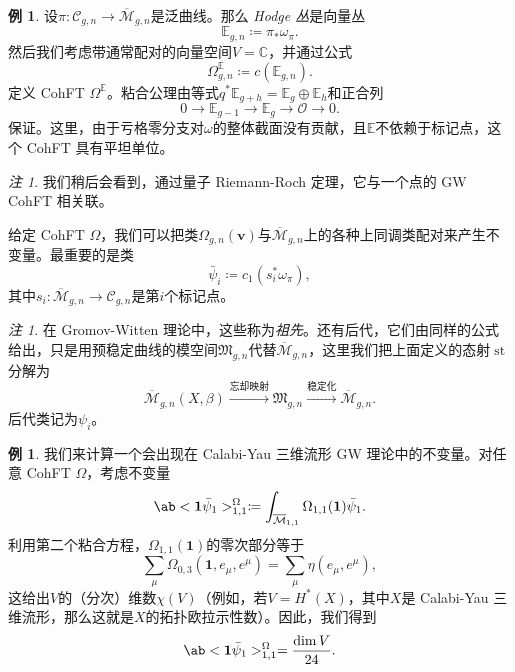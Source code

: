 \documentclass{amsart}
\theoremstyle{definition}
\newtheorem{exm}[thm]{例}
\theoremstyle{remark}
\newtheorem{rmk}[thm]{注}
\theoremstyle{plain}
\theoremstyle{definition}
\theoremstyle{remark}
\newcommand{\C}{\mathbb{C}}
\newcommand{\E}{\mathbb{E}}
\newcommand{\Mbar}{\overline{\mathcal{M}}}
\newcommand{\mc}[1]{\mathcal{#1}}
\newcommand{\mf}[1]{\mathfrak{#1}}
\newcommand{\mbf}[1]{\mathbf{#1}}
\newcommand{\bv}{\mbf{v}}
\newcommand{\1}{\mathbf{1}}
\newcommand{\2}{\mathbf{2}}
\newcommand{\3}{\mathbf{3}}
\DeclareMathOperator{\st}{st}
\begin{document}
\begin{exm}
    设$\pi \colon \mc{C}_{g,n} \to \Mbar_{g,n}$是泛曲线。那么 \textit{Hodge 丛}是向量丛
    \[ \E_{g,n} \coloneqq \pi_* \omega_{\pi}. \]
    然后我们考虑带通常配对的向量空间$V = \C$，并通过公式
    \[ \Omega^{\E}_{g,n} \coloneqq c(\E_{g,n}). \]
    定义 CohFT $\Omega^{\E}$。粘合公理由等式$q^* \E_{g+h} = \E_g \oplus \E_h$和正合列
    \[ 0 \to \E_{g-1} \to \E_g \to \mc{O} \to 0. \]
    保证。这里，由于亏格零分支对$\omega$的整体截面没有贡献，且$\E$不依赖于标记点，这个 CohFT 具有平坦单位。
\end{exm}

\begin{rmk}
    我们稍后会看到，通过量子 Riemann-Roch 定理，它与一个点的 GW CohFT 相关联。
\end{rmk}

给定 CohFT $\Omega$，我们可以把类$\Omega_{g,n}(\bv)$与$\Mbar_{g,n}$上的各种上同调类配对来产生不变量。最重要的是类
\[ \bar{\psi}_i \coloneqq c_1( s_i^* \omega_{\pi} ), \]
其中$s_i \colon \Mbar_{g,n} \to \mc{C}_{g,n}$是第$i$个标记点。

\begin{rmk}
    在 Gromov-Witten 理论中，这些称为\textit{祖先}。还有后代，它们由同样的公式给出，只是用预稳定曲线的模空间$\mf{M}_{g,n}$代替$\Mbar_{g,n}$，这里我们把上面定义的态射$\st$分解为
    \[ \Mbar_{g,n}(X,\beta) \xrightarrow{\text{忘却映射}} \mf{M}_{g,n} \xrightarrow{\text{稳定化}} \Mbar_{g,n}. \]
    后代类记为$\psi_i$。
\end{rmk}

\begin{exm}
    我们来计算一个会出现在 Calabi-Yau 三维流形 GW 理论中的不变量。对任意 CohFT $\Omega$，考虑不变量
    \[ \ab<\1\bar{\psi}_1>_{1,1}^{\Omega}\coloneqq \int_{\Mbar_{1,1}} \Omega_{1,1}(\1)\bar{\psi}_1. \]
    利用第二个粘合方程，$\Omega_{1,1}(\1)$的零次部分等于
    \[ \sum_{\mu} \Omega_{0,3}(\1, e_{\mu}, e^{\mu}) = \sum_{\mu} \eta(e_{\mu}, e^{\mu}), \]
    这给出$V$的（分次）维数$\chi(V)$（例如，若\(V = H^*(X)\)，其中\(X\)是 Calabi-Yau 三维流形，那么这就是\(X\)的拓扑欧拉示性数）。因此，我们得到
    \[ \ab<\1\bar{\psi}_1>_{1,1}^{\Omega} = \frac{\dim V}{24}. \]
\end{exm}
\end{document}
